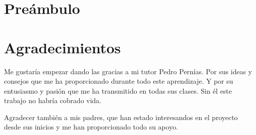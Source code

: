 \chapter*{Preámbulo}





\chapter*{Agradecimientos}

Me gustaría empezar dando las gracias a mi tutor Pedro Pernías. Por sus ideas y consejos que me ha proporcionado durante todo este aprendizaje. Y por su entusiasmo y pasión que me ha transmitido en todas sus clases. Sin él este trabajo no habría cobrado vida.

\vspace{5 mm}

Agradecer también a mis padres, que han estado interesandos en el proyecto desde sus inicios y me han proporcionado todo su apoyo.
